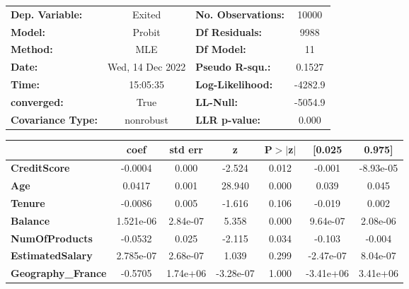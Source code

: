 \begin{center}
\begin{tabular}{lclc}
\toprule
\textbf{Dep. Variable:}     &      Exited      & \textbf{  No. Observations:  } &    10000    \\
\textbf{Model:}             &      Probit      & \textbf{  Df Residuals:      } &     9988    \\
\textbf{Method:}            &       MLE        & \textbf{  Df Model:          } &       11    \\
\textbf{Date:}              & Wed, 14 Dec 2022 & \textbf{  Pseudo R-squ.:     } &   0.1527    \\
\textbf{Time:}              &     15:05:35     & \textbf{  Log-Likelihood:    } &   -4282.9   \\
\textbf{converged:}         &       True       & \textbf{  LL-Null:           } &   -5054.9   \\
\textbf{Covariance Type:}   &    nonrobust     & \textbf{  LLR p-value:       } &    0.000    \\
\bottomrule
\end{tabular}
\begin{tabular}{lcccccc}
                            & \textbf{coef} & \textbf{std err} & \textbf{z} & \textbf{P$> |$z$|$} & \textbf{[0.025} & \textbf{0.975]}  \\
\midrule
\textbf{CreditScore}        &      -0.0004  &        0.000     &    -2.524  &         0.012        &       -0.001    &    -8.93e-05     \\
\textbf{Age}                &       0.0417  &        0.001     &    28.940  &         0.000        &        0.039    &        0.045     \\
\textbf{Tenure}             &      -0.0086  &        0.005     &    -1.616  &         0.106        &       -0.019    &        0.002     \\
\textbf{Balance}            &    1.521e-06  &     2.84e-07     &     5.358  &         0.000        &     9.64e-07    &     2.08e-06     \\
\textbf{NumOfProducts}      &      -0.0532  &        0.025     &    -2.115  &         0.034        &       -0.103    &       -0.004     \\
\textbf{EstimatedSalary}    &    2.785e-07  &     2.68e-07     &     1.039  &         0.299        &    -2.47e-07    &     8.04e-07     \\
\textbf{Geography\_France}  &      -0.5705  &     1.74e+06     & -3.28e-07  &         1.000        &    -3.41e+06    &     3.41e+06     \\

\end{tabular}
\end{center}
